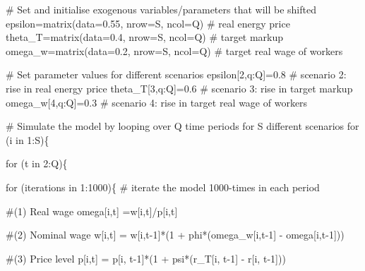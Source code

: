 \documentclass[
  letterpaper,
  DIV=11,
  numbers=noendperiod]{scrreprt}
\newenvironment{Shaded}{\begin{snugshade}}{\end{snugshade}}
\newcommand{\AttributeTok}[1]{\textcolor[rgb]{0.40,0.45,0.13}{#1}}
\newcommand{\CommentTok}[1]{\textcolor[rgb]{0.37,0.37,0.37}{#1}}
\newcommand{\ControlFlowTok}[1]{\textcolor[rgb]{0.00,0.23,0.31}{#1}}
\newcommand{\DecValTok}[1]{\textcolor[rgb]{0.68,0.00,0.00}{#1}}
\newcommand{\FloatTok}[1]{\textcolor[rgb]{0.68,0.00,0.00}{#1}}
\newcommand{\FunctionTok}[1]{\textcolor[rgb]{0.28,0.35,0.67}{#1}}
\newcommand{\NormalTok}[1]{\textcolor[rgb]{0.00,0.23,0.31}{#1}}
\newcommand{\OtherTok}[1]{\textcolor[rgb]{0.00,0.23,0.31}{#1}}
\newcommand{\SpecialCharTok}[1]{\textcolor[rgb]{0.37,0.37,0.37}{#1}}
\begin{document}
\begin{Shaded}
\begin{Highlighting}[]
\CommentTok{\# Set and initialise exogenous variables/parameters that will be shifted}
\NormalTok{epsilon}\OtherTok{=}\FunctionTok{matrix}\NormalTok{(}\AttributeTok{data=}\FloatTok{0.55}\NormalTok{, }\AttributeTok{nrow=}\NormalTok{S, }\AttributeTok{ncol=}\NormalTok{Q)  }\CommentTok{\# real energy price}
\NormalTok{theta\_T}\OtherTok{=}\FunctionTok{matrix}\NormalTok{(}\AttributeTok{data=}\FloatTok{0.4}\NormalTok{, }\AttributeTok{nrow=}\NormalTok{S, }\AttributeTok{ncol=}\NormalTok{Q)       }\CommentTok{\# target markup}
\NormalTok{omega\_w}\OtherTok{=}\FunctionTok{matrix}\NormalTok{(}\AttributeTok{data=}\FloatTok{0.2}\NormalTok{, }\AttributeTok{nrow=}\NormalTok{S, }\AttributeTok{ncol=}\NormalTok{Q)   }\CommentTok{\# target real wage of workers}

\CommentTok{\# Set parameter values for different scenarios}
\NormalTok{epsilon[}\DecValTok{2}\NormalTok{,q}\SpecialCharTok{:}\NormalTok{Q]}\OtherTok{=}\FloatTok{0.8} \CommentTok{\# scenario 2: rise in real energy price}
\NormalTok{theta\_T[}\DecValTok{3}\NormalTok{,q}\SpecialCharTok{:}\NormalTok{Q]}\OtherTok{=}\FloatTok{0.6}     \CommentTok{\# scenario 3: rise in target markup}
\NormalTok{omega\_w[}\DecValTok{4}\NormalTok{,q}\SpecialCharTok{:}\NormalTok{Q]}\OtherTok{=}\FloatTok{0.3} \CommentTok{\# scenario 4: rise in target real wage of workers}

\CommentTok{\# Simulate the model by looping over Q time periods for S different scenarios}
\ControlFlowTok{for}\NormalTok{ (i }\ControlFlowTok{in} \DecValTok{1}\SpecialCharTok{:}\NormalTok{S)\{}
    
  \ControlFlowTok{for}\NormalTok{ (t }\ControlFlowTok{in} \DecValTok{2}\SpecialCharTok{:}\NormalTok{Q)\{}
    
    \ControlFlowTok{for}\NormalTok{ (iterations }\ControlFlowTok{in} \DecValTok{1}\SpecialCharTok{:}\DecValTok{1000}\NormalTok{)\{ }\CommentTok{\# iterate the model 1000{-}times in each period}
    
    \CommentTok{\#(1) Real wage}
\NormalTok{    omega[i,t] }\OtherTok{=}\NormalTok{w[i,t]}\SpecialCharTok{/}\NormalTok{p[i,t]}
      
    \CommentTok{\#(2) Nominal wage}
\NormalTok{    w[i,t] }\OtherTok{=}\NormalTok{ w[i,t}\DecValTok{{-}1}\NormalTok{]}\SpecialCharTok{*}\NormalTok{(}\DecValTok{1} \SpecialCharTok{+}\NormalTok{ phi}\SpecialCharTok{*}\NormalTok{(omega\_w[i,t}\DecValTok{{-}1}\NormalTok{] }\SpecialCharTok{{-}}\NormalTok{ omega[i,t}\DecValTok{{-}1}\NormalTok{]))}
    
    \CommentTok{\#(3) Price level}
\NormalTok{    p[i,t] }\OtherTok{=}\NormalTok{ p[i, t}\DecValTok{{-}1}\NormalTok{]}\SpecialCharTok{*}\NormalTok{(}\DecValTok{1} \SpecialCharTok{+}\NormalTok{ psi}\SpecialCharTok{*}\NormalTok{(r\_T[i, t}\DecValTok{{-}1}\NormalTok{] }\SpecialCharTok{{-}}\NormalTok{ r[i, t}\DecValTok{{-}1}\NormalTok{]))}
    

\end{Highlighting}
\end{Shaded}
\end{document}
